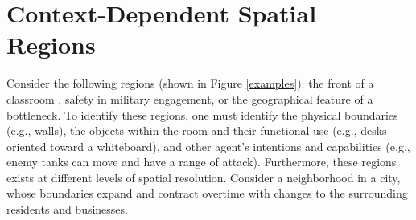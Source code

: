 \documentclass[11pt,letterpaper]{article}
\begin{document}
\section{Context-Dependent Spatial Regions}
Consider the following regions (shown in Figure \ref{examples}): the front of a classroom , safety in military engagement, or the geographical feature of a bottleneck.  To identify these regions, one must identify the physical boundaries (e.g., walls), the objects within the room and their functional use (e.g., desks oriented toward a whiteboard), and other agent's intentions and capabilities (e.g., enemy tanks can move and have a range of attack).  Furthermore, these regions exists at different levels of spatial resolution.  Consider a neighborhood in a city, whose boundaries expand and contract overtime with changes to the surrounding residents and businesses.
\end{document}
